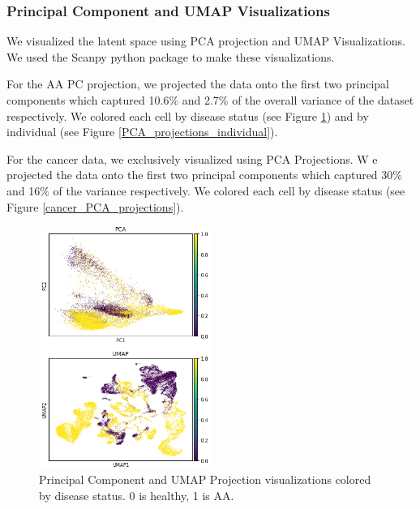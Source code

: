 \documentclass{article}
\begin{document}
\subsubsection{Principal Component and UMAP Visualizations}
We visualized the latent space using PCA projection and UMAP Visualizations.
We used the Scanpy python package \citep{wolf_scanpy_2018} to make these visualizations.

For the AA PC projection, we projected the data onto the first two principal components which captured 10.6\% and 2.7\% of the overall variance of the dataset respectively.
We colored each cell by disease status (see Figure \ref{PCA_projections_disease}) and by individual (see Figure \ref{PCA_projections_individual}).

For the cancer data, we exclusively visualized using PCA Projections.
W e projected the data onto the first two principal components which captured 30\% and 16\% of the variance respectively.
We colored each cell by disease status (see Figure \ref{cancer_PCA_projections}).

\begin{figure}
  \centering
  \includegraphics[width=0.5\textwidth]{disease_status.png}
  \caption{Principal Component and UMAP Projection visualizations colored by disease status. 0 is healthy, 1 is AA.}
  \label{PCA_projections_disease}
\end{figure}
\end{document}
